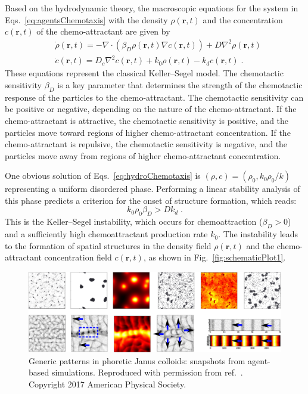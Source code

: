 \documentclass[a4paper, amsfonts, amssymb, amsmath, reprint, showkeys, showpacs, nofootinbib, twoside]{revtex4-2}
\begin{document}
Based on the hydrodynamic theory, the macroscopic equations for the system in Eqs.~\eqref{eq:agentsChemotaxis} with the density $\rho (\mathbf{r},t)$ and the concentration $c(\mathbf{r},t)$ of the chemo-attractant are given by
\begin{subequations}
    \label{eq:hydroChemotaxis}
    \begin{align}
        &\dot{\rho}\left( \mathbf{r},t \right) =-\nabla \cdot \left( \beta _D\rho \left( \mathbf{r},t \right) \nabla c\left( \mathbf{r},t \right) \right) +D\nabla ^2\rho \left( \mathbf{r},t \right)\\
        &\dot{c}\left( \mathbf{r},t \right) =D_c\nabla ^2c\left( \mathbf{r},t \right) +k_0\rho \left( \mathbf{r},t \right) -k_dc\left( \mathbf{r},t \right)\;.
    \end{align}
\end{subequations}
These equations represent the classical Keller--Segel model. The chemotactic sensitivity $\beta _D$ is a key parameter that determines the strength of the chemotactic response of the particles to the chemo-attractant. The chemotactic sensitivity can be positive or negative, depending on the nature of the chemo-attractant. If the chemo-attractant is attractive, the chemotactic sensitivity is positive, and the particles move toward regions of higher chemo-attractant concentration. If the chemo-attractant is repulsive, the chemotactic sensitivity is negative, and the particles move away from regions of higher chemo-attractant concentration.

One obvious solution of Eqs.~\eqref{eq:hydroChemotaxis} is $(\rho, c)=(\rho_0, k_0\rho_0/k)$ representing a uniform disordered phase. Performing a linear stability analysis of this phase predicts a criterion for the onset of structure formation, which reads:
\begin{equation}
    \label{eq:KSinstability}
    k_0\rho_0\beta_D>D k_d\;.
\end{equation}
This is the Keller--Segel instability, which occurs for chemoattraction ($\beta_D>0$) and a sufficiently high chemoattractant production rate $k_0$. The instability leads to the formation of spatial structures in the density field $\rho(\mathbf{r},t)$ and the chemo-attractant concentration field $c(\mathbf{r},t)$, as shown in Fig.~\ref{fig:schematicPlot1}.

\begin{figure}
    \includegraphics[width=\textwidth]{./figs/chemoBehaviors1.png}
    \caption{
        \label{fig:chemoBehaviors1} Generic patterns in phoretic Janus colloids: snapshots from agent-based simulations.
        Reproduced with permission from ref.~\cite{PhysRevLett.118.268001}. Copyright 2017 American Physical Society.
    }
\end{figure}
\end{document}
